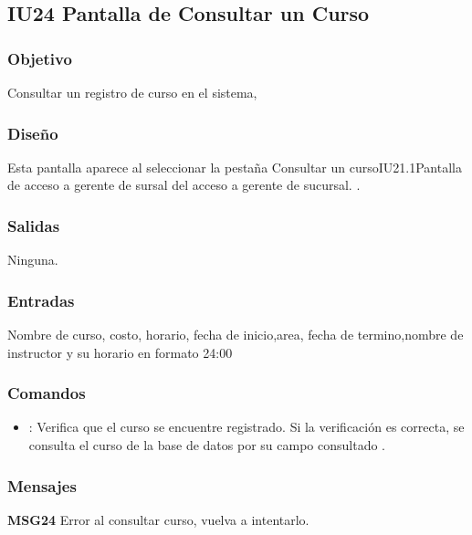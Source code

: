 \subsection{IU24 Pantalla de Consultar un Curso}


\subsubsection{Objetivo}
	Consultar  un registro de curso en el sistema,

\subsubsection{Diseño}
	Esta pantalla aparece al seleccionar la pestaña Consultar un curso{IU21.1}{Pantalla de acceso a gerente de sursal} del acceso a gerente de sucursal. . 


\subsubsection{Salidas}

	Ninguna.

\subsubsection{Entradas}
Nombre de curso, costo, horario, fecha de inicio,area, fecha de termino,nombre de instructor y su  horario en formato 24:00

\subsubsection{Comandos}
	\begin{itemize}
	\item {}: Verifica que el curso se encuentre registrado. Si la verificación es correcta, se consulta el curso de la base de datos por su campo consultado .
\end{itemize}

\subsubsection{Mensajes}
	\begin{Citemize}
		\item {\bf MSG24} Error al consultar curso, vuelva a intentarlo.
	\end{Citemize}
	